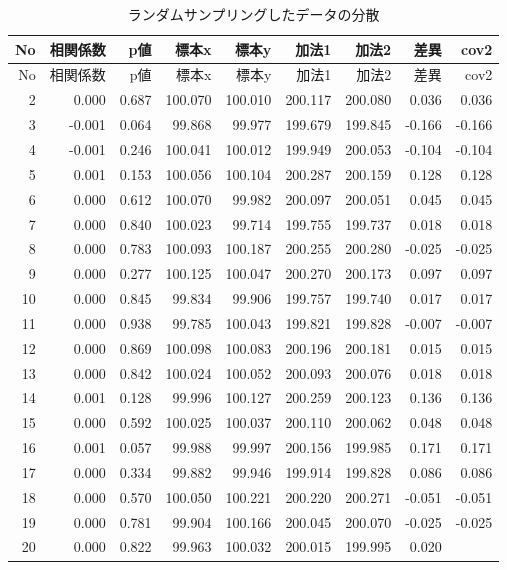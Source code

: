 \documentclass[]{tufte-handout}
\begin{document}
\begin{longtable}[]{@{}rrrrrrrrr@{}}
\caption{ランダムサンプリングしたデータの分散}\tabularnewline
\toprule
No & 相関係数 & p値 & 標本x & 標本y & 加法1 & 加法2 & 差異 & cov2 \\
\midrule
\endfirsthead
\toprule
No & 相関係数 & p値 & 標本x & 標本y & 加法1 & 加法2 & 差異 & cov2 \\
\midrule
\endhead
2 & 0.000 & 0.687 & 100.070 & 100.010 & 200.117 & 200.080 & 0.036 &
0.036 \\
3 & -0.001 & 0.064 & 99.868 & 99.977 & 199.679 & 199.845 & -0.166 &
-0.166 \\
4 & -0.001 & 0.246 & 100.041 & 100.012 & 199.949 & 200.053 & -0.104 &
-0.104 \\
5 & 0.001 & 0.153 & 100.056 & 100.104 & 200.287 & 200.159 & 0.128 &
0.128 \\
6 & 0.000 & 0.612 & 100.070 & 99.982 & 200.097 & 200.051 & 0.045 &
0.045 \\
7 & 0.000 & 0.840 & 100.023 & 99.714 & 199.755 & 199.737 & 0.018 &
0.018 \\
8 & 0.000 & 0.783 & 100.093 & 100.187 & 200.255 & 200.280 & -0.025 &
-0.025 \\
9 & 0.000 & 0.277 & 100.125 & 100.047 & 200.270 & 200.173 & 0.097 &
0.097 \\
10 & 0.000 & 0.845 & 99.834 & 99.906 & 199.757 & 199.740 & 0.017 &
0.017 \\
11 & 0.000 & 0.938 & 99.785 & 100.043 & 199.821 & 199.828 & -0.007 &
-0.007 \\
12 & 0.000 & 0.869 & 100.098 & 100.083 & 200.196 & 200.181 & 0.015 &
0.015 \\
13 & 0.000 & 0.842 & 100.024 & 100.052 & 200.093 & 200.076 & 0.018 &
0.018 \\
14 & 0.001 & 0.128 & 99.996 & 100.127 & 200.259 & 200.123 & 0.136 &
0.136 \\
15 & 0.000 & 0.592 & 100.025 & 100.037 & 200.110 & 200.062 & 0.048 &
0.048 \\
16 & 0.001 & 0.057 & 99.988 & 99.997 & 200.156 & 199.985 & 0.171 &
0.171 \\
17 & 0.000 & 0.334 & 99.882 & 99.946 & 199.914 & 199.828 & 0.086 &
0.086 \\
18 & 0.000 & 0.570 & 100.050 & 100.221 & 200.220 & 200.271 & -0.051 &
-0.051 \\
19 & 0.000 & 0.781 & 99.904 & 100.166 & 200.045 & 200.070 & -0.025 &
-0.025 \\
20 & 0.000 & 0.822 & 99.963 & 100.032 & 200.015 & 199.995 & 0.020 &

\end{longtable}
\end{document}
